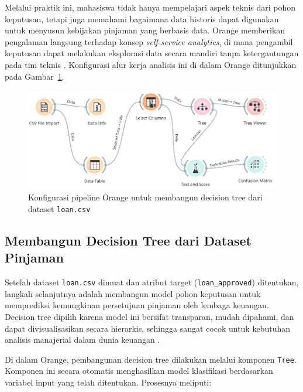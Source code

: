 Melalui praktik ini, mahasiswa tidak hanya mempelajari aspek teknis dari pohon keputusan, tetapi juga memahami bagaimana data historis dapat digunakan untuk menyusun kebijakan pinjaman yang berbasis data. Orange memberikan pengalaman langsung terhadap konsep \textit{self-service analytics}, di mana pengambil keputusan dapat melakukan eksplorasi data secara mandiri tanpa ketergantungan pada tim teknis \cite{demsar2013orange}. Konfigurasi alur kerja analisis ini di dalam Orange ditunjukkan pada Gambar~\ref{fig:pipeline-orange}.

\begin{figure}[h]
	\centering
	\includegraphics[width=\linewidth]{../figures/decision_tree_pipeline.png}
	\caption{Konfigurasi pipeline Orange untuk membangun decision tree dari dataset \texttt{loan.csv}}
	\label{fig:pipeline-orange}
\end{figure}




\subsection{Membangun Decision Tree dari Dataset Pinjaman}

Setelah dataset \texttt{loan.csv} dimuat dan atribut target (\texttt{loan\_approved}) ditentukan, langkah selanjutnya adalah membangun model pohon keputusan untuk memprediksi kemungkinan persetujuan pinjaman oleh lembaga keuangan. Decision tree dipilih karena model ini bersifat transparan, mudah dipahami, dan dapat divisualisasikan secara hierarkis, sehingga sangat cocok untuk kebutuhan analisis manajerial dalam dunia keuangan \cite{camm2020business}.

Di dalam Orange, pembangunan decision tree dilakukan melalui komponen \texttt{Tree}. Komponen ini secara otomatis menghasilkan model klasifikasi berdasarkan variabel input yang telah ditentukan. Prosesnya meliputi:

